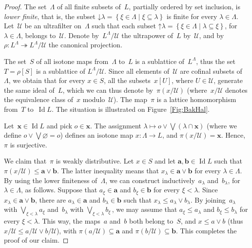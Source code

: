 \documentclass[reqno]{amsart}
\numberwithin{equation}{section}
\theoremstyle{plain}
\theoremstyle{definition}
\theoremstyle{remark}
\numberwithin{figure}{section}
\numberwithin{table}{section}
\begin{document}
\begin{proof}
The set~${\Lambda}$ of all finite subsets of~$L$, partially ordered by set inclusion, is \emph{lower finite}, that is, the subset ${\mathbin{\downarrow}}{\lambda}={{\left\{{{{\xi\in{\Lambda}}}\mid{{\xi\subseteq{\lambda}}}}\right\}}}$ is finite for every ${\lambda}\in{\Lambda}$.
Let~${\mathcal{U}}$ be an ultrafilter on~${\Lambda}$ such that each subset ${\mathbin{\uparrow}}{\lambda}={{\left\{{{{\xi\in{\Lambda}}}\mid{{{\lambda}\subseteq\xi}}}\right\}}}$, for ${\lambda}\in{\Lambda}$, belongs to~${\mathcal{U}}$.
Denote by~$L^{\Lambda}/{\mathcal{U}}$ the ultrapower of~$L$ by~${\mathcal{U}}$, and by $\rho\colon L^{\Lambda}\twoheadrightarrow L^{\Lambda}/{\mathcal{U}}$ the canonical projection.

The set~$S$ of all isotone maps from~${\Lambda}$ to~$L$ is a sublattice of~$L^{\Lambda}$, thus the set $T=\rho[S]$ is a sublattice of $L^{\Lambda}/{\mathcal{U}}$.
Since all elements of~${\mathcal{U}}$ are cofinal subsets of~${\Lambda}$, we obtain that for every $x\in S$, all the subsets~$x[U]$, where $U\in{\mathcal{U}}$, generate the same ideal of~$L$, which we can thus denote by~$\pi(x/{\mathcal{U}})$ (where~$x/{\mathcal{U}}$ denotes the equivalence class of~$x$ modulo~${\mathcal{U}}$).
The map~$\pi$ is a lattice homomorphism from~$T$ to~$\operatorname{Id} L$.
The situation is illustrated on Figure~\ref{Fig:BakHal}.

Let~${\boldsymbol{x}}\in\operatorname{Id} L$ and pick $o\in{\boldsymbol{x}}$.
The assignment ${\lambda}\mapsto o\vee\bigvee({\lambda}\cap{\boldsymbol{x}})$ (where we define $o\vee\bigvee{\varnothing}=o$) defines an isotone map $x\colon{\Lambda}\to L$, and $\pi(x/{\mathcal{U}})={\boldsymbol{x}}$.
Hence, $\pi$ is surjective.

We claim that~$\pi$ is weakly distributive.
Let $x\in S$ and let ${\boldsymbol{a}},{\boldsymbol{b}}\in\operatorname{Id} L$ such that $\pi(x/{\mathcal{U}})\leq{\boldsymbol{a}}\vee{\boldsymbol{b}}$.
The latter inequality means that $x_{\lambda}\in{\boldsymbol{a}}\vee{\boldsymbol{b}}$ for every ${\lambda}\in{\Lambda}$.
By using the lower finiteness of~${\Lambda}$, we can construct inductively~$a_{\lambda}$ and~$b_{\lambda}$, for ${\lambda}\in{\Lambda}$, as follows.
Suppose that $a_{\xi}\in{\boldsymbol{a}}$ and $b_{\xi}\in{\boldsymbol{b}}$ for every $\xi<{\lambda}$.
Since $x_{\lambda}\in{\boldsymbol{a}}\vee{\boldsymbol{b}}$, there are $a_{\lambda}\in{\boldsymbol{a}}$ and $b_{\lambda}\in{\boldsymbol{b}}$ such that $x_{\lambda}\leq a_{\lambda}\vee b_{\lambda}$.
By joining~$a_{\lambda}$ with $\bigvee_{\xi<{\lambda}}a_{\xi}$ and~$b_{\lambda}$ with $\bigvee_{\xi<{\lambda}}b_{\xi}$\,, we may assume that $a_{\xi}\leq a_{\lambda}$ and $b_{\xi}\leq b_{\lambda}$ for every $\xi<{\lambda}$.
This way, the maps~$a$ and~$b$ both belong to~$S$, and $x\leq a\vee b$ (thus $x/{\mathcal{U}}\leq a/{\mathcal{U}}\vee b/{\mathcal{U}}$), with $\pi(a/{\mathcal{U}})\subseteq{\boldsymbol{a}}$ and $\pi(b/{\mathcal{U}})\subseteq{\boldsymbol{b}}$.
This completes the proof of our claim.
\end{proof}
\end{document}
